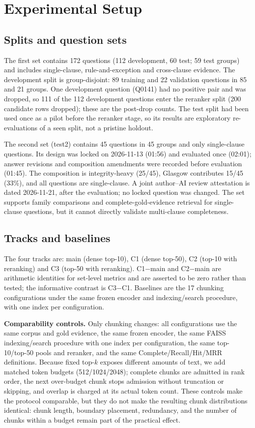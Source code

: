 \documentclass[conference]{IEEEtran}
\begin{document}
\section{Experimental Setup}
\subsection{Splits and question sets}
The first set contains 172 questions (112 development, 60 test; 59 test groups) and includes single-clause, rule-and-exception and cross-clause evidence. The development split is group-disjoint: 89 training and 22 validation questions in 85 and 21 groups. One development question (Q0141) had no positive pair and was dropped, so 111 of the 112 development questions enter the reranker split (200 candidate rows dropped); these are the post-drop counts. The test split had been used once as a pilot before the reranker stage, so its results are exploratory re-evaluations of a seen split, not a pristine holdout.

The second set (test2) contains 45 questions in 45 groups and only single-clause questions. Its design was locked on 2026-11-13 (01:56) and evaluated once (02:01); answer revisions and composition amendments were recorded before evaluation (01:45). The composition is integrity-heavy (25/45), Glasgow contributes 15/45 (33\%), and all questions are single-clause. A joint author--AI review attestation is dated 2026-11-21, after the evaluation; no locked question was changed. The set supports family comparisons and complete-gold-evidence retrieval for single-clause questions, but it cannot directly validate multi-clause completeness.

\subsection{Tracks and baselines}
The four tracks are: main (dense top-10), C1 (dense top-50), C2 (top-10 with reranking) and C3 (top-50 with reranking). C1$-$main and C2$-$main are arithmetic identities for set-level metrics and are asserted to be zero rather than tested; the informative contrast is C3$-$C1. Baselines are the 17 chunking configurations under the same frozen encoder and indexing/search procedure, with one index per configuration.

\textbf{Comparability controls.} Only chunking changes: all configurations use the same corpus and gold evidence, the same frozen encoder, the same FAISS indexing/search procedure with one index per configuration, the same top-10/top-50 pools and reranker, and the same Complete/Recall/Hit/MRR definitions. Because fixed top-$k$ exposes different amounts of text, we add matched token budgets (512/1024/2048); complete chunks are admitted in rank order, the next over-budget chunk stops admission without truncation or skipping, and overlap is charged at its actual token count. These controls make the protocol comparable, but they do not make the resulting chunk distributions identical: chunk length, boundary placement, redundancy, and the number of chunks within a budget remain part of the practical effect.
\end{document}
